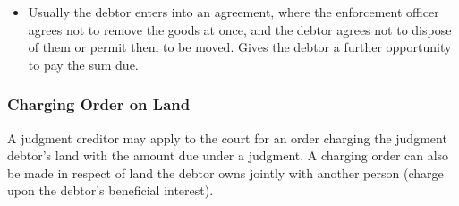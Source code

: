 \documentclass[
]{article}
\providecommand{\tightlist}{%
  \setlength{\itemsep}{0pt}\setlength{\parskip}{0pt}}
\begin{document}
\begin{itemize}
  \begin{itemize}
  \tightlist
  \item
    Usually the debtor enters into an agreement, where the enforcement
    officer agrees not to remove the goods at once, and the debtor
    agrees not to dispose of them or permit them to be moved. Gives the
    debtor a further opportunity to pay the sum due.
  \end{itemize}
\end{itemize}

\hypertarget{charging-order-on-land}{%
\subsubsection{Charging Order on Land}\label{charging-order-on-land}}

A judgment creditor may apply to the court for an order charging the
judgment debtor's land with the amount due under a judgment. A charging
order can also be made in respect of land the debtor owns jointly with
another person (charge upon the debtor's beneficial interest).
\end{document}
